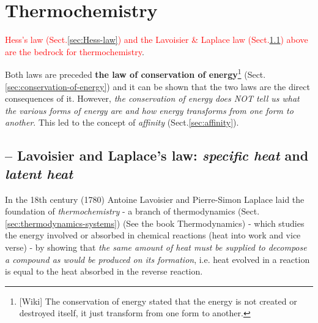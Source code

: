 

\section{Thermochemistry}
\label{sec:thermochemistry}


\textcolor{red}{Hess's law (Sect.\ref{sec:Hess-law}) and the Lavoisier \&
Laplace law (Sect.\ref{sec:Lavoisier-Laplace-law}) above are the bedrock for
thermochemistry}.

Both laws are preceded {\bf the law of conservation of energy}\footnote{[Wiki]
The conservation of energy stated that the energy is not created or destroyed
itself, it just transform from one form to another.}
(Sect.\ref{sec:conservation-of-energy}) and it can be shown that the two laws
are the direct consequences of it. However, {\it the conservation of energy does
NOT tell us what the various forms of energy are and how energy transforms from
one form to another}. This led to the concept of {\it affinity}
(Sect.\ref{sec:affinity}).

\subsection{-- Lavoisier and Laplace's law: {\it specific heat} and {\it latent
heat}}
\label{sec:Lavoisier-Laplace-law}

In the 18th century (1780) Antoine Lavoisier and Pierre-Simon Laplace laid the
foundation of {\it thermochemistry} - a branch of thermodynamics
(Sect.\ref{sec:thermodynamics-systems}) (See the book Thermodynamics) - which
studies the energy involved or absorbed in chemical reactions (heat into work
and vice verse) - by showing that {\it the same amount of heat must be supplied
to decompose a compound as would be produced on its formation}, i.e. heat
evolved in a reaction is equal to the heat absorbed in the reverse reaction.

